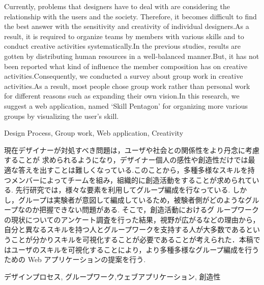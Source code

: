 \documentclass{funthesis}
\begin{document}
\maketitle       %

\begin{eabstract}
Currently, problems that designers have to deal with are considering the relationship with the users and the society. Therefore, it becomes difficult to find the best answer with the sensitivity and creativity of individual designers.As a result, it is required to organize teams by members with various skills and to conduct creative activities systematically.In the previous studies, results are gotten by distributing human resources in a well-balanced manner.But, it has not been reported what kind of influence the member composition has on creative activities.Consequently, we conducted a survey about group work in creative activities.As a result, most people chose group work rather than personal work for different reasons such as expanding their own vision.In this research, we suggest a web application, named ‘Skill Pentagon’ for organizing more various groups by visualizing the user's skill.
\end{eabstract}

\begin{ekeyword}
Design Process, Group work, Web application, Creativity
\end{ekeyword}

\begin{jabstract}
現在デザイナーが対処すべき問題は，ユーザや社会との関係性をより丹念に考慮することが 求められるようになり，デザイナー個人の感性や創造性だけでは最適な答えを出すことは難しくなっている.このことから，多種多様なスキルを持つメンバーによってチームを組み，組織的に創造活動をすることが求められている.  先行研究では，様々な要素を利用してグループ編成を行なっている.  しかし，グループは実験者が意図して編成しているため，被験者側がどのようなグループなのか把握できない問題がある.  そこで，創造活動におけるグ ループワークの現状についてのアンケート調査を行った結果，視野が広がるなどの理由から，自分と異なるスキルを持つ人とグループワークを支持する人が大多数であるということが分かりスキルを可視化することが必要であることが考えられた．本稿ではユーザのスキルを可視化することにより，より多種多様なグループ編成を行うための Web アプリケーションの提案を行う.
\end{jabstract}

\begin{jkeyword}
デザインプロセス, グループワーク,ウェブアプリケーション, 創造性
\end{jkeyword}
\end{document}
